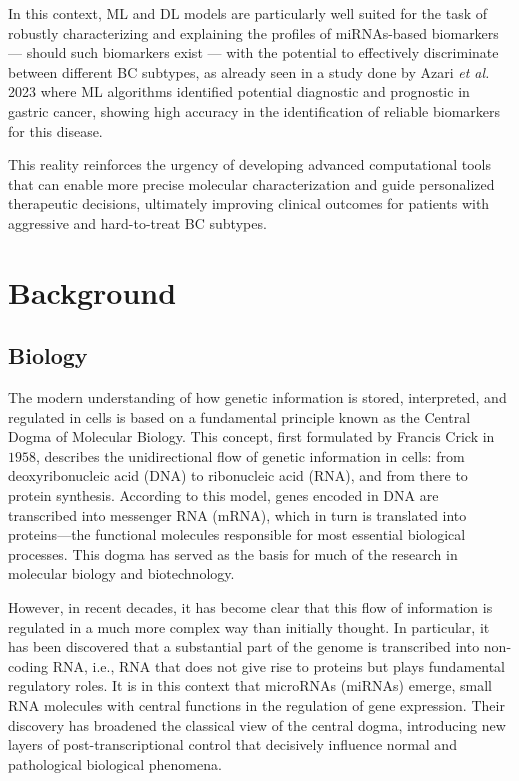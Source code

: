 In this context, \gls{ML} and \gls{DL} models are particularly well suited for the task of robustly characterizing and 
explaining the profiles of \gls{miRNAs}-based biomarkers — should such biomarkers exist — with the potential to effectively 
discriminate between different \gls{BC} subtypes, as already seen in a study done by  \cite{ml_gastric_Azari2023} Azari \textit{et al.} 2023 where \gls{ML} 
algorithms identified potential diagnostic and prognostic  in gastric cancer, showing high accuracy in the 
identification of reliable biomarkers for this disease.

This reality reinforces the urgency of developing advanced computational tools that can enable more precise molecular 
characterization and guide personalized therapeutic decisions, ultimately improving clinical outcomes for patients with 
aggressive and hard-to-treat \gls{BC} subtypes.

\section{Background}
\label{sec:background}
\subsection{Biology}

The modern understanding of how genetic information is stored, interpreted, and regulated in cells is based on a fundamental 
principle known as the Central Dogma of Molecular Biology. This concept, first formulated by Francis Crick in $1958$, describes 
the unidirectional flow of genetic information in cells: from deoxyribonucleic acid (DNA) to ribonucleic acid (RNA), and from there 
to protein synthesis. According to this model, genes encoded in DNA are transcribed into messenger RNA (mRNA), which in turn is 
translated into proteins—the functional molecules responsible for most essential biological processes. This dogma has served as 
the basis for much of the research in molecular biology and biotechnology.

However, in recent decades, it has become clear that this flow of information is regulated in a much more complex way than initially 
thought. In particular, it has been discovered that a substantial part of the genome is transcribed into non-coding RNA, i.e., RNA 
that does not give rise to proteins but plays fundamental regulatory roles. It is in this context that microRNAs (miRNAs) emerge, 
small RNA molecules with central functions in the regulation of gene expression. Their discovery has broadened the classical view 
of the central dogma, introducing new layers of post-transcriptional control that decisively influence normal and pathological biological phenomena.

